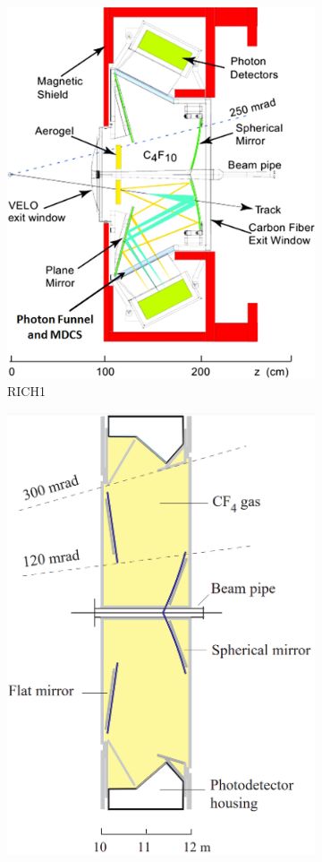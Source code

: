 \begin{figure}
    \centering
    \begin{subfigure}{0.48\textwidth}
    \includegraphics[width=\linewidth]{figures/rich1.jpg}
    \caption{RICH1}\label{RICH1}
    \end{subfigure}
    \hfill
    \begin{subfigure}{0.48\textwidth}
    \includegraphics[width=0.78\linewidth]{figures/rich2.png}

\end{subfigure}
\end{figure}
